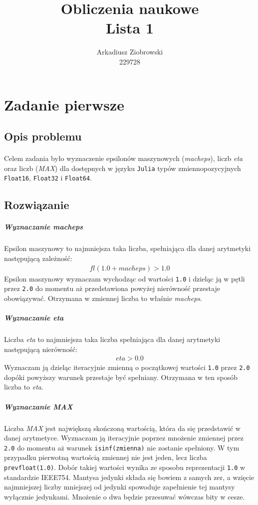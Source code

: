 \documentclass[a4paper]{article}
\title{\huge
  Obliczenia naukowe \\
  \large Lista 1}
\author{Arkadiusz Ziobrowski \\ 229728}
\date{}
\begin{document}
\maketitle

\pagebreak
\section{Zadanie pierwsze}

\subsection{Opis problemu}
\paragraph{}
Celem zadania było wyznaczenie epsilonów maszynowych (\textit{macheps}), liczb \textit{eta} oraz liczb (\textit{MAX}) dla dostępnych w języku \texttt{Julia} typów zmiennopozycyjnych \texttt{Float16}, \texttt{Float32} i \texttt{Float64}.

\subsection{Rozwiązanie}
\paragraph{}
\subparagraph{Wyznaczanie \textit{macheps}}
Epsilon maszynowy to najmniejsza taka liczba, spełniająca dla danej arytmetyki następującą zależność:
\begin{align*}
	fl(1.0 + macheps) > 1.0
\end{align*}
Epsilon maszynowy wyznaczam wychodząc od wartości \texttt{1.0} i dzieląc ją w pętli przez \texttt{2.0} do momentu aż przedstawiona powyżej nierówność przestaje obowiązywać. Otrzymana w zmiennej liczba to właśnie \textit{macheps}.
\subparagraph{Wyznaczanie \textit{eta}}
Liczba \textit{eta} to najmniejsza taka liczba spełniająca dla danej arytmetyki następującą nierówność:
\begin{align*}
	eta > 0.0
\end{align*}
Wyznaczam ją dzieląc iteracyjnie zmienną o początkowej wartości \texttt{1.0} przez \texttt{2.0} dopóki powyższy warunek przestaje być spełniany. Otrzymana w ten sposób liczba to \textit{eta}.
\subparagraph{Wyznaczanie \textit{MAX}}
Liczba \textit{MAX} jest największą skończoną wartością, która da się przedstawić w danej arytmetyce. Wyznaczam ją iteracyjnie poprzez mnożenie zmiennej przez \texttt{2.0} do momentu aż warunek \texttt{isinf(zmienna)} nie zostanie spełniony. W tym przypadku pierwotną wartością zmiennej nie jest jeden, lecz liczba \texttt{prevfloat(1.0)}. Dobór takiej wartości wynika ze sposobu reprezentacji \texttt{1.0} w standardzie IEEE754. Mantysa jedynki składa się bowiem z samych zer, a wzięcie najmniejszej liczby mniejszej od jedynki spowoduje zapełnienie tej mantysy wyłącznie jedynkami. Mnożenie o dwa będzie przesuwać wówczas bity w cesze.
\end{document}
